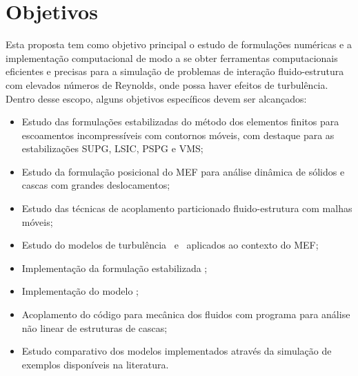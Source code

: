 


\section{Objetivos}

Esta proposta tem como objetivo principal o estudo de formulações numéricas e a implementação computacional de modo a se obter ferramentas computacionais eficientes e precisas para a simulação de problemas de interação fluido-estrutura com elevados números de Reynolds, onde possa haver efeitos de turbulência. Dentro desse escopo, alguns objetivos específicos devem ser alcançados:

\begin{itemize}
    \item Estudo das formulações estabilizadas do método dos elementos finitos para escoamentos incompressíveis com contornos móveis, com destaque para as estabilizações SUPG, LSIC, PSPG e VMS;

    \item Estudo da formulação posicional do MEF para análise dinâmica de sólidos e cascas com grandes deslocamentos;

    \item Estudo das técnicas de acoplamento particionado fluido-estrutura com malhas móveis;

    \item Estudo do modelos de turbulência \RANS\ e \LES\ aplicados ao contexto do MEF;

    \item Implementação da formulação estabilizada \VMS;

    \item Implementação do modelo \LES;

    \item Acoplamento do código para mecânica dos fluidos com programa para análise não linear de estruturas de cascas;

    \item Estudo comparativo dos modelos implementados através da simulação de exemplos disponíveis na literatura.
\end{itemize}

